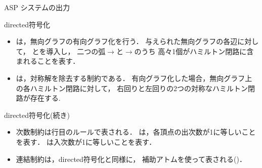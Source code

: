 \documentclass[dvipdfmx,10pt]{beamer}
\begin{document}
\begin{frame}{ASP システムの出力}
\begin{figure}[t]
\begin{center}

\end{center}
\end{figure}
\begin{exampleblock}{}

\end{exampleblock}
\end{frame}
\begin{frame}{\textsf{directed}符号化}
\begin{exampleblock}{}

\end{exampleblock}
\begin{itemize}
\item {}は，無向グラフの有向グラフ化を行う．
      与えられた無向グラフの各辺に対して，
      とを導入し，
      二つの弧$\rightarrow$と$\rightarrow$のうち
      高々1個がハミルトン閉路に含まれることを表す．
\item {}は，対称解を除去する制約である．
      有向グラフ化した場合，無向グラフ上の各ハミルトン閉路に対して，
      右回りと左回りの2つの対称なハミルトン閉路が存在する.
\end{itemize}
\end{frame}
\begin{frame}{\textsf{directed}符号化(続き)}
\begin{exampleblock}{}

\end{exampleblock}
\begin{itemize}
\item 次数制約は行目のルールで表される．
      は，各頂点の出次数が1に等しいことを表す．
      は入次数が1に等しいことを表す．
\item 連結制約は，\textsf{directed}符号化と同様に，
      補助アトムを使って表される()．
\end{itemize}
\end{frame}
\end{document}
